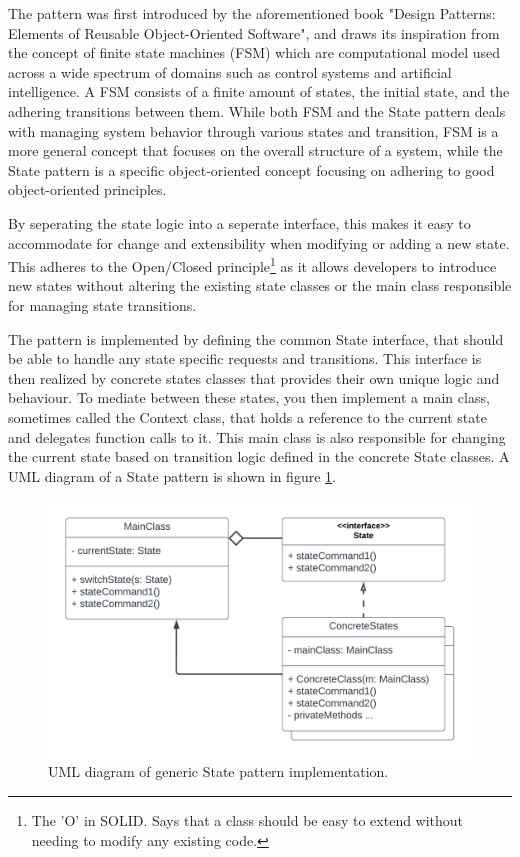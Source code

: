     The pattern was first introduced by the aforementioned book "Design Patterns: Elements of Reusable Object-Oriented Software", and draws its inspiration from the concept of finite state machines (FSM) which are computational model used across a wide spectrum of domains such as control systems and artificial intelligence. A FSM consists of a finite amount of states, the initial state, and the adhering transitions between them. While both FSM and the State pattern deals with managing system behavior through various states and transition, FSM is a more general concept that focuses on the overall structure of a system, while the State pattern is a specific object-oriented concept focusing on adhering to good object-oriented principles.

    By seperating the state logic into a seperate interface, this makes it easy to accommodate for change and extensibility when modifying or adding a new state. This adheres to the Open/Closed principle\footnote{The 'O' in SOLID. Says that a class should be easy to extend without needing to modify any existing code.} as it allows developers to introduce new states without altering the existing state classes or the main class responsible for managing state transitions.

    The pattern is implemented by defining the common State interface, that should be able to handle any state specific requests and transitions. This interface is then realized by concrete states classes that provides their own unique logic and behaviour. To mediate between these states, you then implement a main class, sometimes called the Context class, that holds a reference to the current state and delegates function calls to it. This main class is also responsible for changing the current state based on transition logic defined in the concrete State classes. A UML diagram of a State pattern is shown in figure \ref{fig:state-observer-uml}.
    
    \begin{figure}[H]
      \centering
      \includegraphics[scale=0.75]{Project_report/figures/theory/design_patterns/state_uml.png}
      \caption{UML diagram of generic State pattern implementation.}
      \label{fig:state-observer-uml}
    \end{figure}